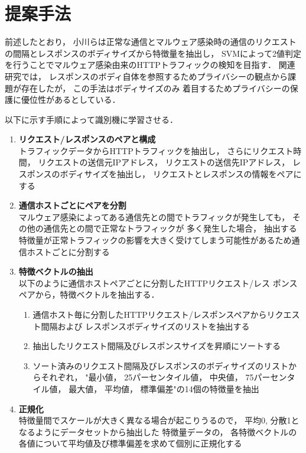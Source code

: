\documentclass[twocolumn,10pt]{ltjsarticle}
\begin{document}
\section{提案手法}
前述したとおり， 小川らは正常な通信とマルウェア感染時の通信のリクエストの間隔とレスポンスのボディサイズから特徴量を抽出し， 
SVMによって2値判定を行うことでマルウェア感染由来のHTTPトラフィックの検知を目指す． 
関連研究では， レスポンスのボディ自体を参照するためプライバシーの観点から課題が存在したが， この手法はボディサイズのみ
着目するためプライバシーの保護に優位性があるとしている． \par
以下に示す手順によって識別機に学習させる． 

\begin{enumerate}
    \item \textbf{リクエスト/レスポンスのペアと構成}\\
    トラフィックデータからHTTPトラフィックを抽出し， さらにリクエスト時間， リクエストの送信元IPアドレス， 
    リクエストの送信先IPアドレス， レスポンスのボディサイズを抽出し， リクエストとレスポンスの情報をペアにする

    \item \textbf{通信ホストごとにペアを分割}\\
    マルウェア感染によってある通信先との間でトラフィックが発生しても， その他の通信先との間で正常なトラフィックが
    多く発生した場合， 抽出する特徴量が正常トラフィックの影響を大きく受けてしまう可能性があるため通信ホストごとに分割する

    \item \textbf{特徴ベクトルの抽出}\\
    以下のように通信ホストペアごとに分割したHTTPリクエスト/レス ポンスペアから，特徴ベクトルを抽出する． 
    \begin{enumerate}
        \item 通信ホスト毎に分割したHTTPリクエスト/レスポンスペアからリクエスト間隔および
        レスポンスボディサイズのリストを抽出する

        \item 抽出したリクエスト間隔及びレスポンスサイズを昇順にソートする

        \item ソート済みのリクエスト間隔及びレスポンスのボディサイズのリストからそれぞれ， 
        "最小値， 25パーセンタイル値， 中央値， 75パーセンタイル値， 最大値， 平均値， 標準偏差"の14個の特徴量を抽出
    \end{enumerate}

    \item \textbf{正規化}\\
    特徴量間でスケールが大きく異なる場合が起こりうるので， 平均0, 分散1となるようにデータセットから抽出した
    特徴量データの， 各特徴ベクトルの各値について平均値及び標準偏差を求めて個別に正規化する
\end{enumerate}
\end{document}
